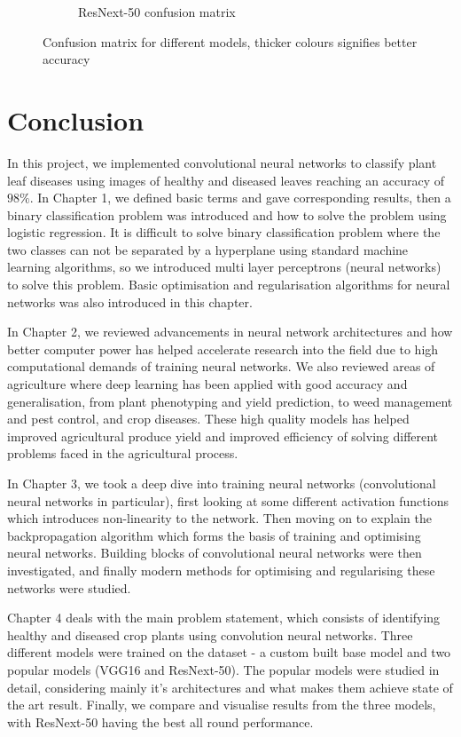 \documentclass[12pt]{report}
\numberwithin{equation}{section}
\begin{document}
\begin{figure}[H]
\begin{subfigure}[t]{\textwidth}
\caption{ResNext-50 confusion matrix}
\label{subfig:resnext_confusion}
\end{subfigure}
\caption[Confusion matrix for different models]{Confusion matrix for different models, thicker colours signifies better accuracy}
\label{fig:confusion_matrix}
\end{figure}





\chapter{Conclusion}
In this project, we implemented convolutional neural networks to classify plant leaf diseases using images of healthy and diseased leaves reaching an accuracy of $98\%$. In Chapter 1, we defined basic terms and gave corresponding results, then a binary classification problem was introduced and how to solve the problem using logistic regression. It is difficult to solve binary classification problem where the two classes can not be separated by a hyperplane using standard machine learning algorithms, so we introduced multi layer perceptrons (neural networks) to solve this problem. Basic optimisation and regularisation algorithms for neural networks was also introduced in this chapter.

In Chapter 2, we reviewed advancements in neural network architectures and how better computer power has helped accelerate research into the field due to high computational demands of training neural networks. We also reviewed areas of agriculture where deep learning has been applied with good accuracy and generalisation, from plant phenotyping and yield prediction, to weed management and pest control, and crop diseases. These high quality models has helped improved agricultural produce yield and improved efficiency of solving different problems faced in the agricultural process.

In Chapter 3, we took a deep dive into training neural networks (convolutional neural networks in particular), first looking at some different activation functions which introduces non-linearity to the network. Then moving on to explain the backpropagation algorithm which forms the basis of training and optimising neural networks. Building blocks of convolutional neural networks were then investigated, and finally modern methods for optimising and regularising these networks were studied.

Chapter 4 deals with the main problem statement, which consists of identifying healthy and diseased crop plants using convolution neural networks. Three different models were trained on the dataset - a custom built base model and two popular models (VGG16 and ResNext-50). The popular models were studied in detail, considering mainly it's architectures and what makes them achieve state of the art result. Finally, we compare and visualise results from the three models, with ResNext-50 having the best all round performance.
\end{document}
